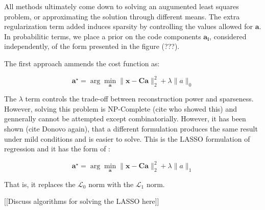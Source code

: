 \documentclass[12pt,a4paper,oneside,english]{UPBThesis}
\begin{document}
All methods ultimately come down to solving an augumented least squares problem, or approximating the solution through different means. The extra regularization term added induces sparsity by controlling the values allowed for $\mathbf{a}$. In probabilitic terms, we place a prior on the code components $\mathbf{a_i}$, considered independently, of the form presented in the figure (???).

The first approach ammends the cost function as:

\begin{equation}
\textbf{a}^{\star} = \arg\min_{\textbf{a}} \| \textbf{x} - \textbf{C}\textbf{a}\|_2^2 + \lambda \|a\|_0
\end{equation}

The $\lambda$ term controls the trade-off between reconstruction power and sparseness. However, solving this problem is NP-Complete (cite who showed this) and gennerally cannot be attempted except combinatorially. However, it has been shown (cite Donovo again), that a different formulation produces the same result under mild conditions and is easier to solve. This is the LASSO formulation of regression and it has the form of :

\begin{equation}
\textbf{a}^{\star} = \arg\min_{\textbf{a}} \| \textbf{x} - \textbf{C}\textbf{a}\|_2^2 + \lambda \|a\|_1
\end{equation}

That is, it replaces the $\mathcal{L}_0$ norm with the $\mathcal{L}_1$ norm.

[[Discuss algorithms for solving the LASSO here]]
\end{document}
